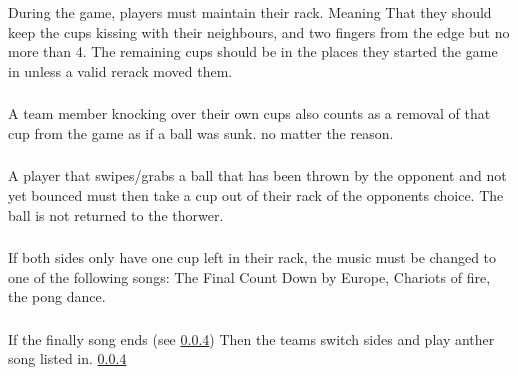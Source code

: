 		\subsubsection{}\label{sssec:MaintainRack}
			During the game, players must maintain their rack.
            Meaning That they should keep the cups kissing with their neighbours, and two fingers from the edge but no more than 4.
            The remaining cups should be in the places they started the game in unless a valid rerack moved them.
		\subsubsection{}\label{sssec:Knockover}
			A team member knocking over their own cups also counts as a removal of that cup from the game as if a ball was sunk. no matter the reason.
		\subsubsection{}\label{sssec:swiping_no_bounce}
			A player that swipes/grabs a ball that has been thrown by the opponent and not yet bounced must then take a cup out of their rack of the opponents choice.
            The ball is not returned to the thorwer.
		\subsubsection{}\label{sssec:FinalCountDown}
			If both sides only have one cup left in their rack, the music must be changed to one of the following songs: The Final Count Down by Europe, Chariots of fire, the pong dance.
		\subsubsection{}\label{sssec:finalSongEnd}
			If the finally song ends (see \ref{sssec:FinalCountDown}) Then the teams switch sides and play anther song listed in. \ref{sssec:FinalCountDown}
